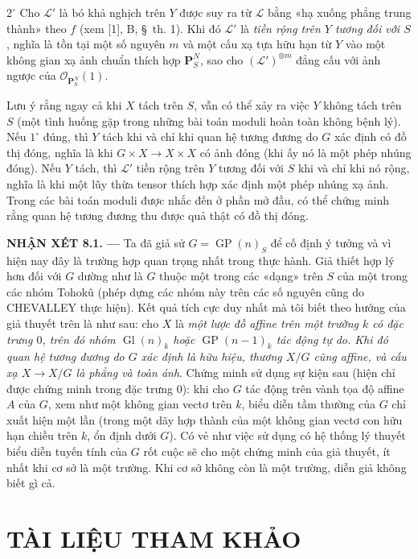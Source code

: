 \smallskip
\noindent $2^\circ$ Cho $\mathcal L'$ là bó khả nghịch trên $Y$ được suy ra
từ $\mathcal L$ bằng «hạ xuống phẳng trung thành» theo $f$ (xem [1], B,
\S~th. 1). Khi đó $\mathcal L'$ là \emph{tiền rộng trên $Y$ tương đối với
$S$}, nghĩa là tồn tại một số nguyên $m$ và một cấu xạ tựa hữu hạn từ $Y$ vào
một không gian xạ ảnh chuẩn thích hợp $\mathbf P_S^N$, sao cho
$(\mathcal L')^{\otimes m}$ đẳng cấu với ảnh ngược của
$\mathcal O_{\mathbf P_S^N}(1)$.

Lưu ý rằng ngay cả khi $X$ tách trên $S$, vẫn có thể xảy ra việc $Y$ không
tách trên $S$ (một tình huống gặp trong những bài toán moduli hoàn toàn không
bệnh lý). Nếu $1^\circ$ đúng, thì $Y$ tách khi và chỉ khi quan hệ tương đương
do $G$ xác định có đồ thị đóng, nghĩa là khi $G\times X\to X\times X$ có ảnh
đóng (khi ấy nó là một phép nhúng đóng). Nếu $Y$ tách, thì $\mathcal L'$ tiền
rộng trên $Y$ tương đối với $S$ khi và chỉ khi nó rộng, nghĩa là khi một lũy
thừa tensor thích hợp xác định một phép nhúng xạ ảnh. Trong các bài toán moduli
được nhắc đến ở phần mở đầu, có thể chứng minh rằng quan hệ tương đương thu
được quả thật có đồ thị đóng.

\medskip
\noindent\textbf{NHẬN XÉT 8.1. ---} Ta đã giả sử
$G=\operatorname{GP}(n)_S$ để cố định ý tưởng và vì hiện nay đây là trường hợp
quan trọng nhất trong thực hành. Giả thiết hợp lý hơn đối với $G$ dường như là
$G$ thuộc một trong các «dạng» trên $S$ của một trong các nhóm Tohokû (phép
dựng các nhóm này trên các số nguyên cũng do CHEVALLEY thực hiện). Kết quả tích
cực duy nhất mà tôi biết theo hướng của giả thuyết trên là như sau: cho $X$ là
\emph{một lược đồ affine trên một trường $k$ có đặc trưng $0$, trên đó nhóm
$\operatorname{Gl}(n)_k$ hoặc $\operatorname{GP}(n-1)_k$ tác động tự do. Khi
đó quan hệ tương đương do $G$ xác định là hữu hiệu, thương $X/G$ cũng affine,
và cấu xạ $X\to X/G$ là phẳng và toàn ánh}. Chứng minh sử dụng sự kiện sau
(hiện chỉ được chứng minh trong đặc trưng $0$): khi cho $G$ tác động trên vành
tọa độ affine $A$ của $G$, xem như một không gian vectơ trên $k$, biểu diễn tầm
thường của $G$ chỉ xuất hiện một lần (trong một dãy hợp thành của một không
gian vectơ con hữu hạn chiều trên $k$, ổn định dưới $G$). Có vẻ như việc sử
dụng có hệ thống
lý thuyết biểu diễn tuyến tính của $G$ rốt cuộc sẽ cho một chứng minh của
giả thuyết, ít nhất khi cơ sở là một trường. Khi cơ sở không còn là một trường,
diễn giả không biết gì cả.

\section*{TÀI LIỆU THAM KHẢO}

